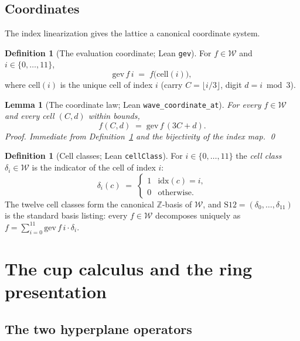 \documentclass[11pt,a4paper]{article}
\theoremstyle{plain}
\newtheorem{lemma}[theorem]{Lemma}
\theoremstyle{definition}
\newtheorem{definition}[theorem]{Definition}
\newcommand{\Z}{\mathbb{Z}}
\begin{document}
\subsection{Coordinates}

The index linearization gives the lattice a canonical coordinate system.

\begin{definition}[The evaluation coordinate; Lean \texttt{gev}]\label{def:gev}
For $f \in \mathcal{W}$ and $i \in \{0,\dots,11\}$,
\[
  \mathrm{gev}\,f\,i \;=\; f\bigl(\mathrm{cell}(i)\bigr),
\]
where $\mathrm{cell}(i)$ is the unique cell of index $i$ (carry
$C = \lfloor i/3\rfloor$, digit $d = i \bmod 3$).
\end{definition}

\begin{lemma}[The coordinate law; Lean \texttt{wave\_coordinate\_at}]
\label{lem:coordinate}
For every $f \in \mathcal{W}$ and every cell $(C,d)$ within bounds,
\[
  f(C,d) \;=\; \mathrm{gev}\,f\,(3C+d).
\]
\emph{Proof.} Immediate from Definition~\ref{def:gev} and the bijectivity of
the index map. \qed
\end{lemma}

\begin{definition}[Cell classes; Lean \texttt{cellClass}]\label{def:cellclass}
For $i \in \{0,\dots,11\}$ the \emph{cell class} $\delta_i \in \mathcal{W}$ is
the indicator of the cell of index $i$:
\[
  \delta_i(c) \;=\; \begin{cases} 1 & \mathrm{idx}(c)=i,\\ 0 &
  \text{otherwise.}\end{cases}
\]
The twelve cell classes form the canonical $\Z$-basis of $\mathcal{W}$, and
$\mathrm{S12} = (\delta_0,\dots,\delta_{11})$ is the standard basis listing:
every $f \in \mathcal{W}$ decomposes uniquely as
$f = \sum_{i=0}^{11} \mathrm{gev}\,f\,i \cdot \delta_i$.
\end{definition}

\section{The cup calculus and the ring presentation}\label{sec:cup}

\subsection{The two hyperplane operators}
\end{document}
